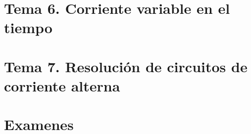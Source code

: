 \documentclass[12pt, twoside, openright]{report} %
\begin{document}
\part{Tema 6. Corriente variable en el tiempo}



\part{Tema 7. Resolución de circuitos de corriente alterna}




\part{Examenes}






























\end{document}
